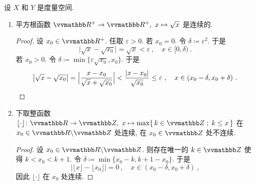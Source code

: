 \begin{example}\label{eg:continuous-function}
    设 \(X\) 和 \(Y\) 是度量空间.
    \begin{enumerate}
        \item 平方根函数 \(\R^+ \to \R^+,\ x \mapsto \sqrt{x}\) 是连续的.
        \begin{proof}
            设 \(x_0 \in \R^+\). 任取 \(\varepsilon > 0\). 若 \(x_0 = 0\). 令 \(\delta \coloneqq \varepsilon^2\). 于是
            \[
                \bigl|\sqrt{x} - \sqrt{x_0}\bigr| = \sqrt{x} < \varepsilon\ ,\quad x \in [0, \delta)\ .
            \]
            若 \(x_0 > 0\). 令 \(\delta \coloneqq \min \bigl\{\varepsilon \sqrt{x_0}, x_0\bigr\}\). 于是
            \[
                \bigl|\sqrt{x} - \sqrt{x_0}\bigr| = \Bigl|\frac{x - x_0}{\sqrt{x} + \sqrt{x_0}}\Bigr| < \frac{|x - x_0|}{\sqrt{x_0}} \leq \varepsilon\ ,\quad x \in (x_0 - \delta, x_0 + \delta)\ .
            \]
        \end{proof}
        \item 下取整函数 \(\lfloor \cdot \rfloor \colon \R \to \Z,\ x \mapsto \max\{\, k \in \Z \;;\; k \leq x \,\}\) 在 \(x_0 \in \R \backslash \Z\) 处连续, 在 \(x_0 \in \Z\) 处不连续.
        \begin{proof}
            设 \(x_0 \in \R \backslash \Z\). 则存在唯一的 \(k \in \Z\) 使得 \(k < x_0 < k + 1\). 令 \(\delta \coloneqq \min\{x_0 - k, k + 1 - x_0\}\). 于是
            \[
                \bigl|\lfloor x \rfloor - \lfloor x_0 \rfloor\bigr| = 0\ ,\quad x \in (x_0 - \delta, x_0 + \delta)\ ,
            \]
            因此 \(\lfloor \cdot \rfloor\) 在 \(x_0\) 处连续.


\end{proof}
\end{enumerate}
\end{example}
